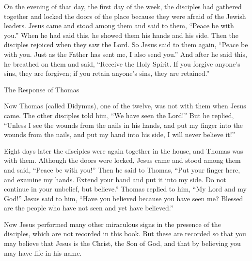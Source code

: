 {\par }{\PP {}On the evening
of that
day,
the first
day of the week,
the disciples
had gathered together and locked
the doors
of the place because
they were afraid
of the
Jewish leaders.
Jesus
came
and
stood
among
them and
said
to them,
“Peace
be with you.”
When
he had said
this,
he showed
them
his hands
and
his side.
Then
the disciples
rejoiced
when
they saw
the Lord.
So
Jesus
said
to them
again,
“Peace
be with you.
Just as
the Father
has sent
me,
I also
send
you.”
And
after
he said
this,
he breathed
on them
and
said, “Receive
the Holy
Spirit.
If
you forgive
anyone’s
sins,
they are forgiven;
if you retain
anyone’s
sins, they are retained.”
\par }{\SH The Response of Thomas
\par }{\PP {}Now Thomas
(called
Didymus), one
of
the twelve,
was
not
with
them
when
Jesus
came.
The other
disciples
told
him,
“We have seen
the Lord!” But
he replied, “Unless
I see
the wounds
from the nails
in
his
hands,
and
put
my
finger
into
the wounds
from the nails,
and
put
my
hand
into
his
side,
I will
never
believe it!”
\par }{\PP {}Eight
days
later
the disciples
were
again
together in
the house, and
Thomas
was with
them.
Although the doors
were locked,
Jesus
came
and
stood
among
them and
said,
“Peace
be with you!”
Then
he said
to Thomas,
“Put
your
finger
here,
and
examine
my
hands.
Extend
your
hand
and
put
it into
my
side.
Do
not
continue
in your unbelief,
but
believe.”
Thomas
replied
to him, “My
Lord
and
my
God!”
Jesus said
to him,
“Have you believed
because
you have seen
me? Blessed
are the people who have
not
seen
and
yet have believed.”
\par }{\PP {}Now Jesus
performed
many
other
miraculous signs
in the presence of
the disciples,
which
are
not
recorded
in
this
book.
But
these
are recorded
so that
you may believe
that
Jesus
is
the Christ,
the Son
of God,
and
that
by believing
you may have
life
in
his
name.

}
